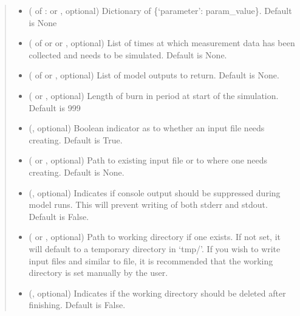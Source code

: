 \documentclass[letterpaper,10pt,english]{sphinxmanual}
\begin{document}
\begin{fulllineitems}
\begin{quote}
\begin{description}
\begin{itemize}
\item {} 
 ( of :  or , optional) \textendash{} Dictionary of \{‘parameter’: param\_value\}. Default is None

\item {} 
 ( of  or  or , optional) \textendash{} List of times at which measurement data has been collected and needs
to be simulated. Default is None.

\item {} 
 ( of  or , optional) \textendash{} List of model outputs to return. Default is None.

\item {} 
 ( or , optional) \textendash{} Length of burn in period at start of the simulation. Default is 999

\item {} 
 (, optional) \textendash{} Boolean indicator as to whether an input file needs creating. Default
is True.

\item {} 
 ( or , optional) \textendash{} Path to existing input file or to where one needs creating. Default is
None.

\item {} 
 (, optional) \textendash{} Indicates if console output should be suppressed during model runs.
This will prevent writing of both stderr and stdout. Default is False.

\item {} 
 ( or , optional) \textendash{} Path to working directory if one exists. If not set, it will default
to a temporary directory in ‘tmp/’. If you wish to write input files
and similar to file, it is recommended that the working directory is
set manually by the user.

\item {} 
 (, optional) \textendash{} Indicates if the working directory should be deleted after finishing.
Default is False.


\end{itemize}
\end{description}
\end{quote}
\end{fulllineitems}
\end{document}
